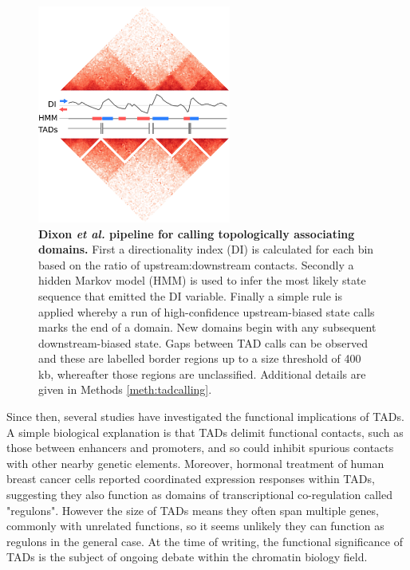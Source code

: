 \documentclass[a4paper,11pt,oneside]{book}
\begin{document}
\begin{figure}
\begin{center}
\includegraphics[width=2.5in]{di_example.png}
\captionsetup{width=\textwidth}
\caption[Dixon \emph{et al.} pipeline for calling topologically associating domains.]{ {\bf Dixon \emph{et al.} pipeline for calling topologically associating domains.} First a directionality index (DI) is calculated for each bin based on the ratio of upstream:downstream contacts. Secondly a hidden Markov model (HMM) is used to infer the most likely state sequence that emitted the DI variable. Finally a simple rule is applied whereby a run of high-confidence upstream-biased state calls marks the end of a domain. New domains begin with any subsequent downstream-biased state. Gaps between TAD calls can be observed and these are labelled border regions up to a size threshold of 400 kb, whereafter those regions are unclassified.\cite{Dixon2012} Additional details are given in Methods \ref{meth:tadcalling}.
}\label{fig:dicalc}
\end{center}
\end{figure} 

Since then, several studies have investigated the functional implications of TADs. A simple biological explanation is that TADs delimit functional contacts, such as those between enhancers and promoters, and so could inhibit spurious contacts with other nearby genetic elements.\cite{Fraser2015, Sexton2015} Moreover, hormonal treatment of human breast cancer cells reported coordinated expression responses within TADs, suggesting they also function as domains of transcriptional co-regulation called "regulons".\cite{LeDily2014} However the size of TADs means they often span multiple genes, commonly with unrelated functions, so it seems unlikely they can function as regulons in the general case.\cite{Pombo2015} At the time of writing, the functional significance of TADs is the subject of ongoing debate within the chromatin biology field.
\end{document}
